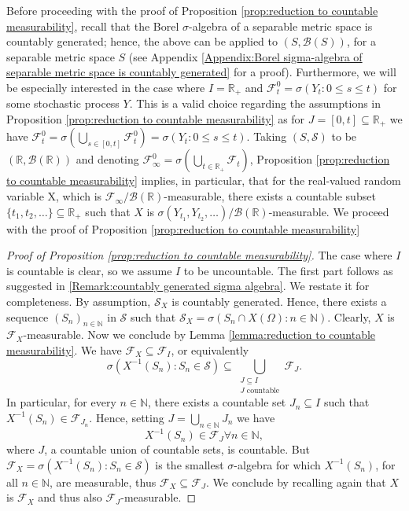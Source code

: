 \documentclass[11pt,a4paper,twoside,openany]{report}
\numberwithin{equation}{section}
\theoremstyle{plain} %
\theoremstyle{definition} %
\theoremstyle{remark} %
\begin{document}
 Before proceeding with the proof of Proposition \ref{prop:reduction to countable measurability}, recall that the Borel \(\sigma\)-algebra of a separable metric space is countably generated; hence, the above can be applied to \((S,\mathcal{B}(S))\), for a separable metric space \(S\) (see Appendix \ref{Appendix:Borel sigma-algebra of separable metric space is countably generated} for a proof).
 Furthermore, we will be especially interested in the case where \(I=\mathbb{R}_+\) and \(\mathcal{F}^0_t=\sigma(Y_t:0\leq s\leq t)\) for some stochastic process \(Y\). This is a valid choice regarding the assumptions in Proposition \ref{prop:reduction to countable measurability} as for \(J=[0,t]\subseteq\mathbb{R}_+\) we have \(\mathcal{F}^0_t=\sigma(\bigcup_{s\in[0,t]}\mathcal{F}^0_t)=\sigma(Y_t:0\leq s\leq t)\). Taking \((S,\mathcal{S})\) to be \((\mathbb{R},\mathcal{B}(\mathbb{R}))\) and denoting \(\mathcal{F}^0_{\infty}=
\sigma(\bigcup_{t\in\mathbb{R}_+}\mathcal{F}_t)\),  Proposition \ref{prop:reduction to countable measurability} implies, in particular, that for the real-valued random variable X, which is \(\mathcal{F}_{\infty}/\mathcal{B}(\mathbb{R})\)-measurable, there exists a countable subset \(\{t_1,t_2,\dots\}\subseteq\mathbb{R}_+\) such that \(X\) is \(\sigma(Y_{t_1},Y_{t_2},\dots)/\mathcal{B}(\mathbb{R})\)-measurable.
 We proceed with the proof of Proposition \ref{prop:reduction to countable measurability}
 \begin{proof}[Proof of Proposition \ref{prop:reduction to countable measurability}]
 The case where \(I\) is countable is clear, so we assume \(I\) to be uncountable.
 The first part follows as suggested in \cref{Remark:countably generated sigma algebra}. We restate it for completeness. By assumption, \(\mathcal{S}_X\) is countably generated. Hence, there exists a sequence \((S_n)_{n\in\mathbb{N}}\) in \(\mathcal{S}\) such that \(\mathcal{S}_X=\sigma(S_n\cap X(\Omega):n\in\mathbb{N})\). 
 Clearly, \(X\) is \(\mathcal{F}_X\)-measurable. Now we conclude by Lemma \ref{lemma:reduction to countable measurability}. We have \(\mathcal{F}_X\subseteq\mathcal{F}_I\), or equivalently
 \begin{equation*}
     \sigma(X^{-1}(S_n):S_n\in\mathcal{S})\subseteq\bigcup_{\substack{J\subseteq I\\ J\text{ countable}}}\mathcal{F}_J.
 \end{equation*}
 In particular, for every \(n\in\mathbb{N}\), there exists a countable set \(J_n\subseteq I\) such that
 \(X^{-1}(S_n)\in \mathcal{F}_{J_n}\). Hence, setting \(J=\bigcup_{n\in\mathbb{N}}J_n\) we have 
 \begin{equation*}
     X^{-1}(S_n)\in\mathcal{F}_J\forall n\in\mathbb{N},
 \end{equation*}
 where \(J\), a countable union of countable sets, is countable.
 But \(\mathcal{F}_X=\sigma(X^{-1}(S_n):S_n\in\mathcal{S})\) is the smallest \(\sigma\)-algebra for which \(X^{-1}(S_n)\), for all \(n\in\mathbb{N}\), are measurable, thus \(\mathcal{F}_X\subseteq \mathcal{F}_J\). We conclude by recalling again that \(X\) is \(\mathcal{F}_X\) and thus also \(\mathcal{F}_J\)-measurable.
   \end{proof}
\end{document}

